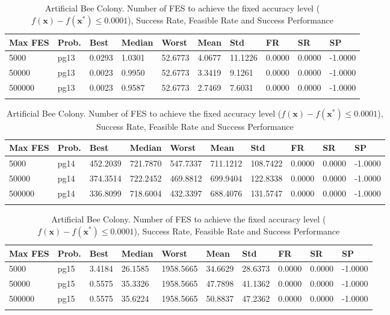 \documentclass[10pt, a4paper]{book}
\begin{document}
\begin{center}
\begin{longtable}{l l l l l l l l l l}
\textbf{Max FES} & \textbf{Prob.} & \textbf{Best} & \textbf{Median} & \textbf{Worst} & \textbf{Mean} & \textbf{Std} & \textbf{FR} & \textbf{SR} & \textbf{SP} \\
\hline
5000 & pg13 & 0.0293 & 1.0301 & 52.6773 & 4.0677 & 11.1226 & 0.0000 & 0.0000 & -1.0000 \\
50000 & pg13 & 0.0023 & 0.9950 & 52.6773 & 3.3419 & 9.1261 & 0.0000 & 0.0000 & -1.0000 \\
500000 & pg13 & 0.0023 & 0.9587 & 52.6773 & 2.7469 & 7.6031 & 0.0000 & 0.0000 & -1.0000 \\

\caption{ Artificial Bee Colony. Number of FES to achieve the fixed accuracy level ($f(\mathbf{x}) - f(\mathbf{x}^{*}) \leq 0.0001$), Success Rate, Feasible Rate and Success Performance }
\end{longtable}
\end{center}

\begin{center}
\begin{longtable}{l l l l l l l l l l}
\textbf{Max FES} & \textbf{Prob.} & \textbf{Best} & \textbf{Median} & \textbf{Worst} & \textbf{Mean} & \textbf{Std} & \textbf{FR} & \textbf{SR} & \textbf{SP} \\
\hline
5000 & pg14 & 452.2039 & 721.7870 & 547.7337 & 711.1212 & 108.7422 & 0.0000 & 0.0000 & -1.0000 \\
50000 & pg14 & 374.3514 & 722.2452 & 469.8812 & 699.9404 & 122.8338 & 0.0000 & 0.0000 & -1.0000 \\
500000 & pg14 & 336.8099 & 718.6004 & 432.3397 & 688.4076 & 131.5747 & 0.0000 & 0.0000 & -1.0000 \\

\caption{ Artificial Bee Colony. Number of FES to achieve the fixed accuracy level ($f(\mathbf{x}) - f(\mathbf{x}^{*}) \leq 0.0001$), Success Rate, Feasible Rate and Success Performance }
\end{longtable}
\end{center}

\begin{center}
\begin{longtable}{l l l l l l l l l l}
\textbf{Max FES} & \textbf{Prob.} & \textbf{Best} & \textbf{Median} & \textbf{Worst} & \textbf{Mean} & \textbf{Std} & \textbf{FR} & \textbf{SR} & \textbf{SP} \\
\hline
5000 & pg15 & 3.4184 & 26.1585 & 1958.5665 & 34.6629 & 28.6373 & 0.0000 & 0.0000 & -1.0000 \\
50000 & pg15 & 0.5575 & 35.3326 & 1958.5665 & 47.7898 & 41.1362 & 0.0000 & 0.0000 & -1.0000 \\
500000 & pg15 & 0.5575 & 35.6224 & 1958.5665 & 50.8837 & 47.2362 & 0.0000 & 0.0000 & -1.0000 \\

\caption{ Artificial Bee Colony. Number of FES to achieve the fixed accuracy level ($f(\mathbf{x}) - f(\mathbf{x}^{*}) \leq 0.0001$), Success Rate, Feasible Rate and Success Performance }
\end{longtable}
\end{center}
\end{document}
